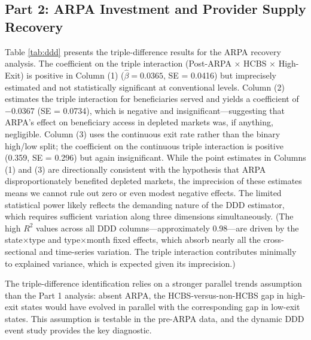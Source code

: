 \documentclass[12pt]{article}
\begin{document}
\subsection{Part 2: ARPA Investment and Provider Supply Recovery}

Table \ref{tab:ddd} presents the triple-difference results for the ARPA recovery analysis. The coefficient on the triple interaction (Post-ARPA $\times$ HCBS $\times$ High-Exit) is positive in Column (1) ($\hat{\beta} = 0.0365$, SE = 0.0416) but imprecisely estimated and not statistically significant at conventional levels. Column (2) estimates the triple interaction for beneficiaries served and yields a coefficient of $-0.0367$ (SE = 0.0734), which is negative and insignificant---suggesting that ARPA's effect on beneficiary access in depleted markets was, if anything, negligible. Column (3) uses the continuous exit rate rather than the binary high/low split; the coefficient on the continuous triple interaction is positive (0.359, SE = 0.296) but again insignificant. While the point estimates in Columns (1) and (3) are directionally consistent with the hypothesis that ARPA disproportionately benefited depleted markets, the imprecision of these estimates means we cannot rule out zero or even modest negative effects. The limited statistical power likely reflects the demanding nature of the DDD estimator, which requires sufficient variation along three dimensions simultaneously. (The high $R^2$ values across all DDD columns---approximately 0.98---are driven by the state$\times$type and type$\times$month fixed effects, which absorb nearly all the cross-sectional and time-series variation. The triple interaction contributes minimally to explained variance, which is expected given its imprecision.)



The triple-difference identification relies on a stronger parallel trends assumption than the Part 1 analysis: absent ARPA, the HCBS-versus-non-HCBS gap in high-exit states would have evolved in parallel with the corresponding gap in low-exit states. This assumption is testable in the pre-ARPA data, and the dynamic DDD event study provides the key diagnostic.
\end{document}
